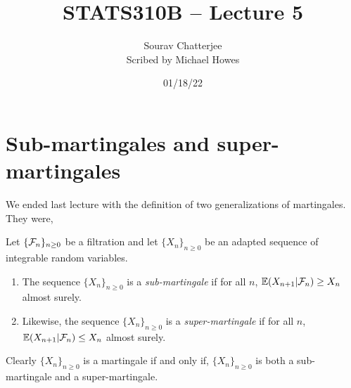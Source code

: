 




\title{STATS310B -- Lecture 5}
\author{Sourav Chatterjee\\ Scribed by Michael Howes}
\date{01/18/22}

\pagestyle{fancy}
\fancyhf{}


\maketitle
\tableofcontents
\section{Sub-martingales and super-martingales}
We  ended last  lecture  with  the definition of two generalizations  of  martingales. They  were,
\begin{definition}
    Let  $\{{\mathcal{F}}_n\}_{n \ge 0}$ be a filtration  and let $\{X_n\}_{n \ge 0}$ be  an adapted  sequence    of   integrable random  variables.  
    \begin{enumerate}
        \item The sequence $\{X_n\}_{n \ge 0}$  is a  \emph{sub-martingale}  if  for all $n$, ${\mathbb{E}}(X_{n+1}|{\mathcal{F}}_n)  \ge X_n$ almost surely. 
        \item Likewise,  the  sequence $\{X_n\}_{n  \ge  0}$ is a  \emph{super-martingale} if for  all  $n$,  ${\mathbb{E}}(X_{n+1}|{\mathcal{F}}_n) \le X_n$  almost surely.
    \end{enumerate}
\end{definition}
Clearly  $\{X_n\}_{n \ge 0}$ is   a  martingale if and only   if, $\{X_n\}_{n \ge 0}$ is both a sub-martingale and a super-martingale.
